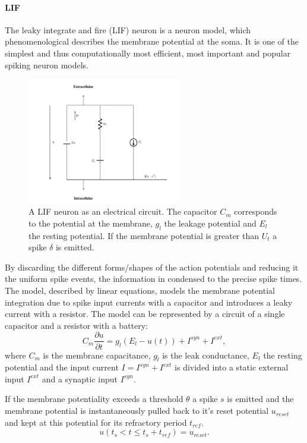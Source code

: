 \paragraph{LIF}

The leaky integrate and fire (LIF) neuron is a neuron model, which phenomenological describes the membrane potential at the soma. 
It is one of the simplest and thus computationally most efficient, most important and popular spiking neuron models.  

\begin{figure}
	\centering
    	\includegraphics[width=0.6\textwidth]{imgs/lif.png} 
    \caption{A LIF neuron as an electrical circuit. The capacitor $C_m$ corresponds to the potential at the membrane, $g_l$ the leakage potential and $E_l$ the resting potential. If the membrane potential is greater than $U_t$ a spike $\delta$ is emitted.}
	\label{fig:lif}
\end{figure}

By discarding the different forms/shapes of the action potentials and reducing it the uniform spike events, the information in condensed to the precise spike times.
The model, described by linear equations, models the membrane potential integration due to spike input currents with a capacitor and introduces a leaky current with a resistor. 
The model can be represented by a circuit of a single capacitor and a resistor with a battery:
\[
C_m \frac{\partial u}{\partial t} = g_l ( E_l - u(t) ) + I^{syn} + I^{ext} , 
\]
where $C_m$ is the membrane capacitance, $g_l$ is the leak conductance, $E_l$ the resting potential and the input current $I = I^{syn} + I^{ext}$ is divided into a static external input $I^{ext}$ and a synaptic input $I^{syn}$.   

If the membrane potentiality exceeds a threshold $\theta$ a spike $s$ is emitted and the membrane potential is instantaneously pulled back to it's reset potential $u_{reset}$ and kept at this potential for its refractory period $t_{ref}$.
\[
u(t_{s} < t \le t_{s} + t_{ref}) = u_{reset}.
\]

